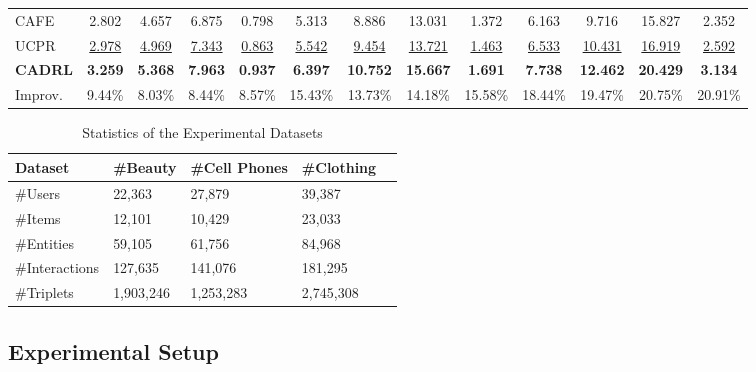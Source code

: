 \documentclass[conference]{IEEEtran}
\begin{document}
\begin{table}
{\begin{tabular}{l|cccc|cccc|cccc}
    CAFE  &2.802  &4.657  &6.875  &0.798 &5.313  &8.886   &13.031   &1.372 &6.163 &9.716 &15.827 &2.352\\




        UCPR  &{\underline {2.978}}  &{\underline {4.969}}  &{\underline {7.343}}  &{\underline {0.863}}    & {\underline {5.542}} &{\underline {9.454}} &{\underline {13.721}} &{\underline {1.463}} &{\underline {6.533}} &{\underline {10.431}} &{\underline {16.919}} &{\underline {2.592}}\\





    {\bf CADRL }  &{\bf3.259}  &{\bf5.368}   &{\bf7.963}  & {\bf0.937}  & {\bf 6.397} & {\bf10.752}  & {\bf15.667}  & {\bf1.691} & {\bf7.738}  & {\bf12.462}  & {\bf20.429} &{\bf3.134}\\
    \hline
        Improv.    &9.44\%   & 8.03\%  &8.44\% &  8.57\% &15.43\%  &13.73\% &14.18\% & 15.58\%  &18.44\% &19.47\% &20.75\% &20.91\% \\
   	\bottomrule
   \end{tabular}
  }
  \label{Table2}
 \end{table}

\begin{table}
	\centering
	\caption{Statistics of the Experimental Datasets}
 \vspace{-0.2cm}
	\begin{tabular}{lllll}
		\hline
		Dataset     & \#Beauty  & \#Cell Phones        & \#Clothing  &   \\
		\hline
		\#Users       & 22,363  &27,879    & 39,387 \\
		\#Items      & 12,101  & 10,429      & 23,033 \\
  \#Entities      &59,105  &61,756      &84,968\\
		\#Interactions    & 127,635  &141,076    & 181,295 \\
            \#Triplets    & 1,903,246  &1,253,283     & 2,745,308\\
		\hline
	\end{tabular}
	\label{Table1}
\end{table}
 
\subsection{Experimental Setup}
\end{document}
